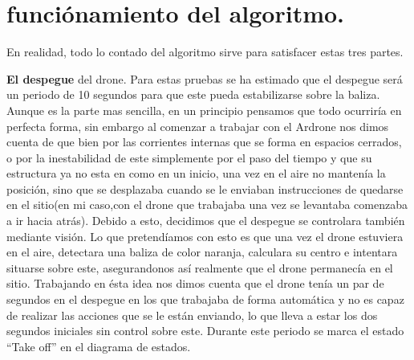 \section{funci\'onamiento del algoritmo.}
\hspace{1cm} En realidad, todo lo contado del algoritmo sirve para satisfacer estas tres partes. 

\hspace{1cm} \textbf{El despegue} del drone. Para estas pruebas se ha estimado que el despegue ser\'a un periodo de 10 segundos para que este pueda estabilizarse sobre la baliza. Aunque es la parte mas sencilla, en un principio pensamos que todo ocurrir\'ia en perfecta forma, sin embargo al comenzar a trabajar con el Ardrone nos dimos cuenta de que bien por las corrientes internas que se forma en espacios cerrados, o por la inestabilidad de este simplemente por el paso del tiempo y que su estructura ya no esta en como en un inicio, una vez en el aire no manten\'ia la posici\'on, sino que se desplazaba cuando se le enviaban instrucciones de quedarse en el sitio(en mi caso,con el drone que trabajaba una vez se levantaba comenzaba a ir hacia atr\'as). Debido a esto, decidimos que el despegue se controlara tambi\'en mediante visi\'on. Lo que pretend\'iamos con esto es que una vez el drone estuviera en el aire, detectara una baliza de color naranja, calculara su centro e intentara situarse sobre este, asegurandonos as\'i realmente que el drone permanec\'ia en el sitio. Trabajando en \'esta idea nos dimos cuenta que el drone ten\'ia un par de segundos en el despegue en los que trabajaba de forma autom\'atica y no es capaz de realizar las acciones que se le est\'an enviando, lo que lleva a estar los dos segundos iniciales sin control sobre este. Durante este periodo se marca el estado "`Take off"' en el diagrama de estados.

